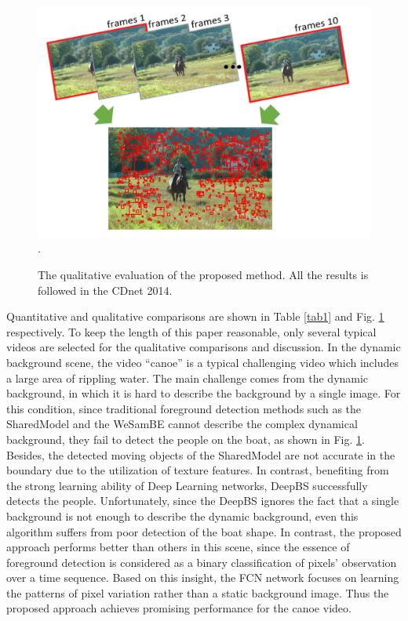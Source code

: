 \documentclass[journal]{IEEEtran}
\newcommand{\reffig}[1]{Fig. \ref{#1}}
\newcommand{\reftab}[1]{Table \ref{#1}}
\begin{document}
\begin{figure}[!t]	\centering
    \includegraphics[width=\textwidth]{figure/fig3}
\DeclareGraphicsExtensions.
    \caption{The qualitative evaluation of the proposed method. All the results is followed in the CDnet 2014.}
    \label{results_chart}
\end{figure}

Quantitative and qualitative comparisons are shown in \reftab{tab1} and  \reffig{results_chart} respectively. 
To keep the length of this paper reasonable, only several typical videos are selected for the qualitative comparisons and discussion. 
In the dynamic background scene, the video ``canoe'' is a typical challenging video which includes a large area of rippling water. 
The main challenge comes from the dynamic background, in which it is hard to describe the background by a single image. 
For this condition, since traditional foreground detection methods such as the SharedModel and the WeSamBE cannot describe the complex dynamical background, they fail to detect the people on the boat, as shown in \reffig{results_chart}. 
Besides, the detected moving objects of the SharedModel are not accurate in the boundary due to the utilization of texture features. 
In contrast, benefiting from the strong learning ability of Deep Learning networks, DeepBS successfully detects the people. 
Unfortunately, since the DeepBS ignores the fact that a single background is not enough to describe the dynamic background, even this algorithm suffers from poor detection of the boat shape. 
In contrast, the proposed approach performs better than others in this scene, since the essence of foreground detection is considered as a binary classification of pixels' observation over a time sequence. 
Based on this insight, the FCN network focuses on learning the patterns of pixel variation rather than a static background image.
Thus the proposed approach achieves promising performance for the canoe video.
\end{document}
